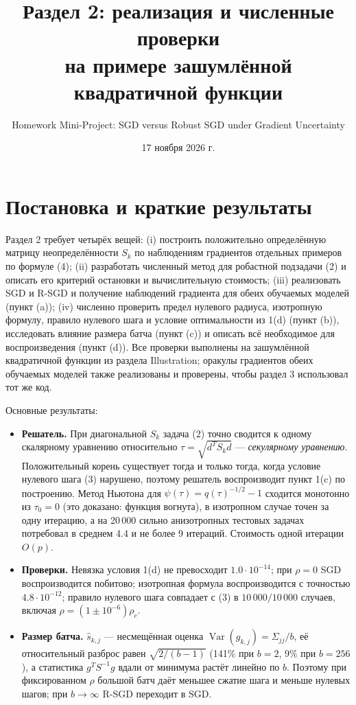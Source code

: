 \documentclass[11pt,a4paper]{article}
\title{Раздел 2: реализация и численные проверки\\[0.2em]
\large на примере зашумлённой квадратичной функции}
\author{Homework Mini-Project: SGD versus Robust SGD under Gradient Uncertainty}
\date{17 ноября 2026 г.}
\DeclareMathOperator{\Var}{Var}
\begin{document}
\maketitle

\section*{Постановка и краткие результаты}

Раздел 2 требует четырёх вещей: (i) построить положительно определённую матрицу
неопределённости $S_k$ по наблюдениям градиентов отдельных примеров по формуле (4);
(ii) разработать численный метод для робастной подзадачи (2) и описать его критерий
остановки и вычислительную стоимость; (iii) реализовать SGD и R-SGD и получение
наблюдений градиента для обеих обучаемых моделей (пункт (a)); (iv) численно проверить
предел нулевого радиуса, изотропную формулу, правило нулевого шага и условие
оптимальности из 1(d) (пункт (b)), исследовать влияние размера батча (пункт (c)) и
описать всё необходимое для воспроизведения (пункт (d)). Все проверки выполнены на
зашумлённой квадратичной функции из раздела Illustration; оракулы градиентов обеих
обучаемых моделей также реализованы и проверены, чтобы раздел 3 использовал тот же код.

Основные результаты:
\begin{itemize}
\item \textbf{Решатель.} При диагональной $S_k$ задача (2) точно сводится к одному
скалярному уравнению относительно $\tau=\sqrt{d^TS_kd}$ — \emph{секулярному
уравнению}. Положительный корень существует тогда и только тогда, когда условие
нулевого шага (3) нарушено, поэтому решатель воспроизводит пункт 1(c) по построению.
Метод Ньютона для $\psi(\tau)=q(\tau)^{-1/2}-1$ сходится монотонно из $\tau_0=0$ (это
доказано: функция вогнута), в изотропном случае точен за одну итерацию, а на
20\,000 сильно анизотропных тестовых задачах потребовал в среднем 4.4 и не более 9
итераций. Стоимость одной итерации $O(p)$.
\item \textbf{Проверки.} Невязка условия 1(d) не превосходит $1.0\cdot10^{-14}$;
при $\rho=0$ SGD воспроизводится побитово; изотропная формула воспроизводится с
точностью $4.8\cdot10^{-12}$; правило нулевого шага совпадает с (3) в
$10\,000/10\,000$ случаев, включая $\rho=(1\pm10^{-6})\rho_c$.
\item \textbf{Размер батча.} $\widehat s_{k,j}$ — несмещённая оценка
$\Var(g_{k,j})=\Sigma_{jj}/b$, её относительный разброс равен $\sqrt{2/(b-1)}$ (141\%
при $b=2$, 9\% при $b=256$), а статистика $g^TS^{-1}g$ вдали от минимума растёт
линейно по $b$. Поэтому при фиксированном $\rho$ большой батч даёт меньшее сжатие
шага и меньше нулевых шагов; при $b\to\infty$ R-SGD переходит в SGD.
\end{itemize}
\end{document}
